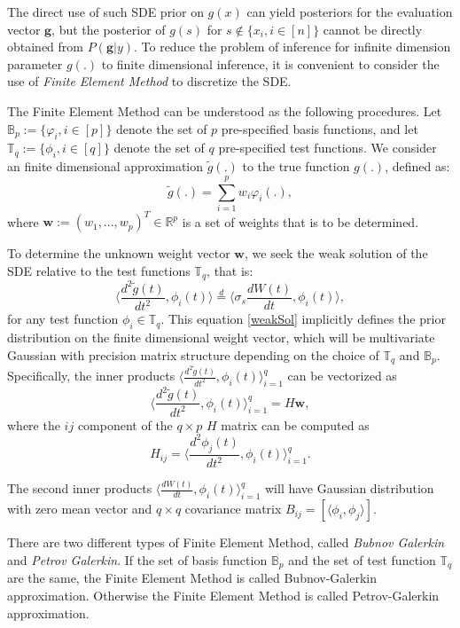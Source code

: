 \documentclass{article}
\begin{document}
The direct use of such SDE prior on $g(x)$ can yield posteriors for the evaluation vector $\boldsymbol g$, but the posterior of $g(s)$ for $s \notin \{x_i,i\in[n]\}$ cannot be directly obtained from $P(\boldsymbol g|y)$. To reduce the problem of inference for infinite dimension parameter $g(.)$ to finite dimensional inference, it is convenient to consider the use of \textit{Finite Element Method} to discretize the SDE.

The Finite Element Method can be understood as the following procedures. Let $\mathbb{B}_p:=\{\varphi_i, i \in [p] \}$ denote the set of $p$ pre-specified basis functions, and let $\mathbb{T}_q:=\{\phi_i, i \in [q]\}$ denote the set of $q$ pre-specified test functions. We consider an finite dimensional approximation $\tilde{g}(.)$ to the true function $g(.)$, defined as:
\begin{equation}\label{discretization}
\tilde{g}(.) = \sum_{i=1}^{p}w_i \varphi_i(.),
\end{equation}
where $\boldsymbol{w} := (w_1,...,w_p)^T \in \mathbb{R}^p$ is a set of weights that is to be determined. 

To determine the unknown weight vector $\boldsymbol{w}$, we seek the weak solution of the SDE relative to the test functions $\mathbb{T}_q$, that is:
\begin{equation}\label{weakSol}
\langle \frac{d^2\tilde{g}(t)}{dt^2} , \phi_i(t)\rangle \overset{d}= \langle \sigma_s\frac{dW(t)}{dt} , \phi_i(t)\rangle,
\end{equation}
for any test function $\phi_i \in \mathbb{T}_q$. This equation \ref{weakSol} implicitly defines the prior distribution on the finite dimensional weight vector, which will be multivariate Gaussian with precision matrix structure depending on the choice of $\mathbb{T}_q$ and $\mathbb{B}_p$. Specifically, the inner products $\langle \frac{d^2\tilde{g}(t)}{dt^2} , \phi_i(t)\rangle_{i=1}^q$ can be vectorized as $$\langle \frac{d^2\tilde{g}(t)}{dt^2} , \phi_i(t)\rangle_{i=1}^q =H \boldsymbol w,$$ where the $ij$ component of the $q \times p$ $H$ matrix can be computed as $$H_{ij} = \langle \frac{d^2\phi_j(t)}{dt^2} , \phi_i(t)\rangle_{i=1}^q.$$

The second inner products $\langle \frac{dW(t)}{dt} , \phi_i(t)\rangle_{i=1}^q$ will have Gaussian distribution with zero mean vector and $q \times q$ covariance matrix $B_{ij}=[\langle \phi_i ,\phi_j\rangle]$.

There are two different types of Finite Element Method, called \textit{Bubnov Galerkin} and \textit{Petrov Galerkin}. If the set of basis function $\mathbb{B}_p$ and the set of test function $\mathbb{T}_q$ are the same, the Finite Element Method is called Bubnov-Galerkin approximation. Otherwise the Finite Element Method is called Petrov-Galerkin approximation.
\end{document}
